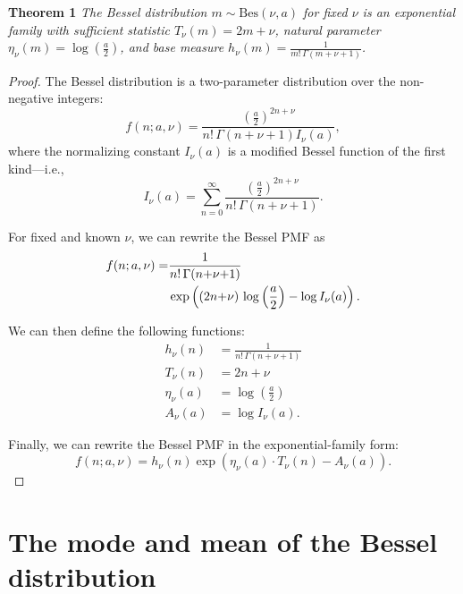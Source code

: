 \documentclass[letterpaper]{article}
\newcommand{\teq}{\!=\!}
\newcommand{\tp}{\!+\!}
\begin{document}
  \textbf{Theorem 1}
    \label{theorem:expfam}
    \textit{The Bessel distribution $m \!\sim\!\textrm{Bes}(\nu, a)$ for fixed
   $\nu$ is an exponential family with sufficient statistic $T_\nu(m) \teq 2m
   \tp \nu$, natural parameter $\eta_\nu(m) \teq \log\left(\frac{a}{2}\right)$,
   and base measure $h_\nu(m) \teq \frac{1}{m!\,\Gamma(m+\nu+1)}$.}
  \begin{proof}
  The Bessel distribution \citep{yuan2000bessel} is a two-parameter distribution
  over the non-negative integers:
  \begin{equation}
  f(n; a, \nu) = \frac{\left(\frac{a}{2}\right)^{2n+\nu}}{n!\, \Gamma(n{+}\nu{+}1) I_\nu(a)},
  \end{equation}
  where the normalizing constant $I_\nu(a)$ is a modified Bessel function of the
  first kind---i.e.,
  \begin{equation}
  I_\nu(a) = \sum_{n=0}^\infty
  \frac{\left(\frac{a}{2}\right)^{2n+\nu}}{n!\, \Gamma(n{+}\nu{+}1)}.
  \end{equation}

  For fixed and known $\nu$, we can rewrite the Bessel PMF as
  \begin{align}
    f(n; a, \nu) =&
    \frac{1}{n!\,\Gamma(n{+}\nu{+}1)} \notag\\
    &\exp\left((2n{+}\nu)\,\log\left(\frac{a}{2}\right)
    -\log I_\nu(a)\right).
    \end{align}

  We can then define the following functions:
  \begin{align}
  h_\nu(n) &= \frac{1}{n!\,\Gamma(n{+}\nu{+}1)} \\
  T_\nu(n) &= 2n+\nu\\
  \eta_\nu(a) &= \log\left(\frac{a}{2}\right) \\
  A_\nu(a) &= \log I_\nu(a).
  \end{align}

  Finally, we can rewrite the Bessel PMF in the exponential-family form:
  \begin{equation}
  f(n; a, \nu) = h_\nu(n) \exp{\left(\eta_\nu(a) \cdot T_\nu(n) -
  A_\nu(a)\right)}.
  \end{equation}
  \end{proof}
  
  \section{The mode and mean of the Bessel distribution}
  \label{sec:besselmode}
  
\end{document}
